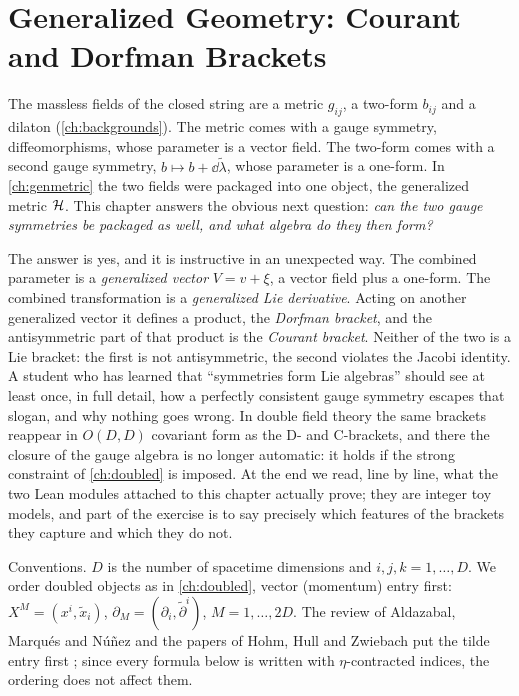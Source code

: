 \chapter{Generalized Geometry: Courant and Dorfman Brackets}\label{ch:courant}

The massless fields of the closed string are a metric $g_{ij}$, a two-form $b_{ij}$ and a dilaton
(\cref{ch:backgrounds}). The metric comes with a gauge symmetry, diffeomorphisms, whose parameter
is a vector field. The two-form comes with a second gauge symmetry, $b\mapsto b+\dd\tilde\lambda$,
whose parameter is a one-form. In \cref{ch:genmetric} the two fields were packaged into one
object, the generalized metric $\mathcal{H}$. This chapter answers the obvious next question: \emph{can
the two gauge symmetries be packaged as well, and what algebra do they then form?}

The answer is yes, and it is instructive in an unexpected way. The combined parameter is a
\emph{generalized vector} $V=v+\xi$, a vector field plus a one-form. The combined transformation
is a \emph{generalized Lie derivative}. Acting on another generalized vector it defines a product,
the \emph{Dorfman bracket}, and the antisymmetric part of that product is the \emph{Courant
bracket}. Neither of the two is a Lie bracket: the first is not antisymmetric, the second violates
the Jacobi identity. A student who has learned that ``symmetries form Lie algebras'' should see at
least once, in full detail, how a perfectly consistent gauge symmetry escapes that slogan, and why
nothing goes wrong. In double field theory the same brackets reappear in $O(D,D)$ covariant form
as the D- and C-brackets, and there the closure of the gauge algebra is no longer automatic: it
holds if the strong constraint of \cref{ch:doubled} is imposed. At the end we read, line by line,
what the two Lean modules attached to this chapter actually prove; they are integer toy models,
and part of the exercise is to say precisely which features of the brackets they capture and which
they do not.

Conventions. $D$ is the number of spacetime dimensions and $i,j,k=1,\dots,D$. We order doubled
objects as in \cref{ch:doubled}, vector (momentum) entry first:
$X^M=(x^i,\tilde x_i)$, $\partial_M=(\partial_i,\tilde\partial^i)$, $M=1,\dots,2D$. The review of
Aldazabal, Marqu\'es and N\'u\~nez and the papers of Hohm, Hull and Zwiebach put the tilde entry
first ; since every
formula below is written with $\eta$-contracted indices, the ordering does not affect them.

